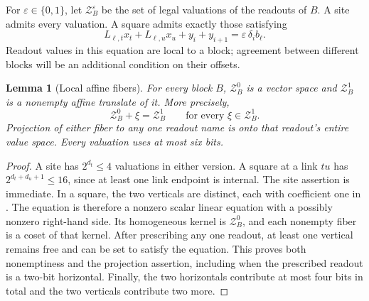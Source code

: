 \documentclass[11pt]{article}
\newtheorem{lemma}[theorem]{Lemma}
\theoremstyle{definition}
\newcommand{\cZ}{\mathcal Z}
\newcommand{\eps}{\varepsilon}
\begin{document}
For \(\eps\in\{0,1\}\), let \(\cZ_B^\eps\) be the set of legal valuations
of the readouts of \(B\). A site admits every valuation. A square admits
exactly those satisfying
\begin{equation}
 L_{\ell,t}x_t+L_{\ell,u}x_u+y_i+y_{i+1}
       =\eps\,\delta_i b_\ell.
 \label{eq:square-equation}
\end{equation}
Readout values in this equation are local to a block; agreement between
different blocks will be an additional condition on their offsets.

\begin{lemma}[Local affine fibers]
\label{lem:block-fibers}
For every block \(B\), \(\cZ_B^0\) is a vector space and \(\cZ_B^1\)
is a nonempty affine translate of it. More precisely,
\[
 \cZ_B^0+\xi=\cZ_B^1\qquad\text{for every }\xi\in\cZ_B^1.
\]
Projection of either fiber to any one readout name is onto that
readout's entire value space. Every valuation uses at most six bits.
\end{lemma}

\begin{proof}
A site has \(2^{d_t}\le4\) valuations in either version.
A square at a link \(tu\) has \(2^{d_t+d_u+1}\le16\), since at least
one link endpoint is internal. The site assertion is immediate. In a square, the two verticals are
distinct, each with coefficient one in .
The equation is therefore a nonzero scalar linear equation with a
possibly nonzero right-hand side. Its homogeneous kernel is
\(\cZ_B^0\), and each nonempty fiber is a coset of that kernel.
After prescribing any one readout, at least one vertical remains free
and can be set to satisfy the equation. This proves both nonemptiness
and the projection assertion, including when the prescribed readout is
a two-bit horizontal. Finally, the two horizontals contribute at most
four bits in total and the two verticals contribute two more.
\end{proof}
\end{document}
